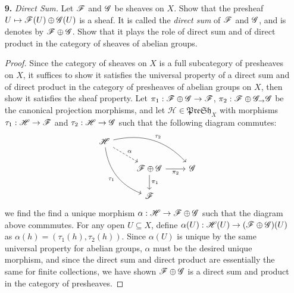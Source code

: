 \documentclass{article}
\begin{document}
\begin{enumerate} [label=\textbf{\arabic*.}, leftmargin=0em]
\item[\textbf{9.}] \textit{Direct Sum.} Let $\mathscr{F}$ and $\mathscr{G}$ be sheaves on $X$. Show that the presheaf $U \mapsto \mathscr{F}(U) \oplus \mathscr{G}(U)$ is a sheaf. It is called the \textit{direct sum} of $\mathscr{F}$ and $\mathscr{G}$, and is denotes by $\mathscr{F} \oplus \mathscr{G}$. Show that it plays the role of direct sum and of direct product in the category of sheaves of abelian groups.

\begin{proof}
   Since the category of sheaves on $X$ is a full subcategory of presheaves on $X$, it suffices to show it satisfies the universal property of a direct sum and of direct product in the category of presheaves of abelian groups on $X$, then show it satisfies the sheaf property. Let $\pi_1 : \mathscr{F} \oplus \mathscr{G} \to \mathscr{F}$, $\pi_2 : \mathscr{F} \oplus \mathscr{G}_ \to \mathscr{G}$ be the canonical projection morphisms, and let $\mathscr{H} \in \mathfrak{PreSh}_X$ with morphisms $\tau_1 : \mathscr{H} \to \mathscr{F}$ and $\tau_2 : \mathscr{H} \to \mathscr{G}$ such that the following diagram commutes:
   \[ \begin{tikzcd}
    \mathscr{H} \arrow[rrd, "\tau_2", bend left] \arrow[rdd, "\tau_1"', bend right] \arrow[rd, "\alpha", dashed] &                                                                       &             \\
                                                                                                                 & \mathscr{F} \oplus \mathscr{G} \arrow[d, "\pi_1"] \arrow[r, "\pi_2"'] & \mathscr{G} \\
                                                                                                                 & \mathscr{F}                                                           &            
    \end{tikzcd} \]
    we find the find a unique morphism $\alpha : \mathscr{H} \to \mathscr{F} \oplus \mathscr{G}$ such that the diagram above commmutes. For any open $U \subseteq X$, define $\alpha(U) : \mathscr{H}(U) \to (\mathscr{F} \oplus \mathscr{G})(U)$ as $\alpha(h) = (\tau_1(h), \tau_2(h))$. Since $\alpha(U)$ is unique by the same universal property for abelian groups, $\alpha$ must be the desired unique morphism, and since the direct sum and direct product are essentially the same for finite collections, we have shown $\mathscr{F} \oplus \mathscr{G}$ is a direct sum and product in the category of presheaves. 


\end{proof}
\end{enumerate}
\end{document}
